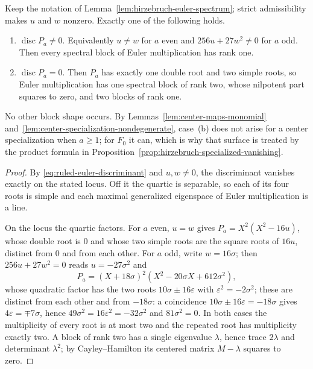 \begin{lemma}
\label{lem:ruled-degeneracy-dichotomy}
%
%
Keep the notation of Lemma~\ref{lem:hirzebruch-euler-spectrum}; strict
admissibility makes \(u\) and \(w\) nonzero.  Exactly one of the following
holds.
\begin{enumerate}[label=(\alph*)]
\item \(\operatorname{disc}P_a\ne0\).  Equivalently \(u\ne w\) for \(a\) even and
\(256u+27w^2\ne0\) for \(a\) odd.  Then every spectral block of Euler
multiplication has rank one.
\item \(\operatorname{disc}P_a=0\).  Then \(P_a\) has exactly one double root and
two simple roots, so Euler multiplication has one spectral block of rank two,
whose nilpotent part squares to zero, and two blocks of rank one.
\end{enumerate}
No other block shape occurs.  By
Lemmas~\ref{lem:center-maps-monomial}
and~\ref{lem:center-specialization-nondegenerate}, case~(b) does not arise for
a center specialization when \(a\ge1\); for \(F_0\) it can, which is why that
surface is treated by the product formula in
Proposition~\ref{prop:hirzebruch-specialized-vanishing}.
\end{lemma}

\begin{proof}
By \eqref{eq:ruled-euler-discriminant} and \(u,w\ne0\), the discriminant vanishes
exactly on the stated locus.  Off it the quartic is separable, so each of its
four roots is simple and each maximal generalized eigenspace of Euler
multiplication is a line.

On the locus the quartic factors.  For \(a\) even, \(u=w\) gives
\(P_a=X^2(X^2-16u)\), whose double root is \(0\) and whose two simple roots are
the square roots of \(16u\), distinct from \(0\) and from each other.  For \(a\)
odd, write \(w=16\sigma\); then \(256u+27w^2=0\) reads \(u=-27\sigma^2\) and
\[
 P_a=(X+18\sigma)^2\left(X^2-20\sigma X+612\sigma^2\right),
\]
whose quadratic factor has the two roots \(10\sigma\pm16\varepsilon\) with
\(\varepsilon^2=-2\sigma^2\); these are distinct from each other and from
\(-18\sigma\): a coincidence \(10\sigma\pm16\varepsilon=-18\sigma\) gives
\(4\varepsilon=\mp7\sigma\), hence \(49\sigma^2=16\varepsilon^2=-32\sigma^2\)
and \(81\sigma^2=0\).  In both cases
the multiplicity of every root is at most two and the repeated root has
multiplicity exactly two.  A block of rank two has a single eigenvalue
\(\lambda\), hence trace \(2\lambda\) and determinant \(\lambda^2\); by
Cayley--Hamilton its centered matrix \(M-\lambda\) squares to zero.
\end{proof}

